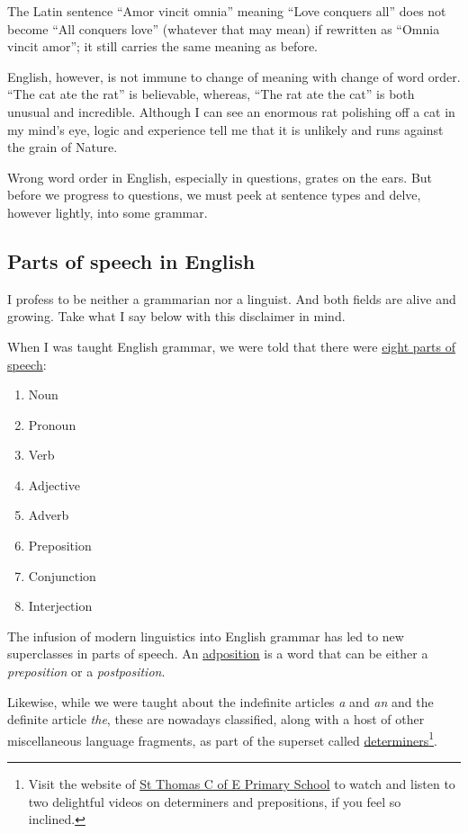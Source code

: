 \documentclass[
  a4paper,
]{article}
\providecommand{\tightlist}{%
  \setlength{\itemsep}{0pt}\setlength{\parskip}{0pt}}
\begin{document}
The Latin sentence ``Amor vincit omnia'' meaning ``Love conquers all''
does not become ``All conquers love'' (whatever that may mean) if
rewritten as ``Omnia vincit amor''; it still carries the same meaning as
before.

English, however, is not immune to change of meaning with change of word
order. ``The cat ate the rat'' is believable, whereas, ``The rat ate the
cat'' is both unusual and incredible. Although I can see an enormous rat
polishing off a cat in my mind's eye, logic and experience tell me that
it is unlikely and runs against the grain of Nature.

Wrong word order in English, especially in questions, grates on the
ears. But before we progress to questions, we must peek at sentence
types and delve, however lightly, into some grammar.

\hypertarget{parts-of-speech-in-english}{%
\subsection{Parts of speech in
English}\label{parts-of-speech-in-english}}

I profess to be neither a grammarian nor a linguist. And both fields are
alive and growing. Take what I say below with this disclaimer in mind.

When I was taught English grammar, we were told that there were
\href{http://www.butte.edu/departments/cas/tipsheets/grammar/parts_of_speech.html}{eight
parts of speech}:

\begin{enumerate}
\tightlist
\item
  Noun
\item
  Pronoun
\item
  Verb
\item
  Adjective
\item
  Adverb
\item
  Preposition
\item
  Conjunction
\item
  Interjection
\end{enumerate}

The infusion of modern linguistics into English grammar has led to new
superclasses in parts of speech. An
\href{https://glossary.sil.org/term/adposition}{adposition} is a word
that can be either a \emph{preposition} or a \emph{postposition}.

Likewise, while we were taught about the indefinite articles \emph{a}
and \emph{an} and the definite article \emph{the}, these are nowadays
classified, along with a host of other miscellaneous language fragments,
as part of the superset called
\href{https://en.wikipedia.org/wiki/Determiner}{determiners}\footnote{Visit
  the website of
  \href{https://www.stthomaswernethprimary.co.uk/determiners-and-prepositions-1/}{St
  Thomas C of E Primary School} to watch and listen to two delightful
  videos on determiners and prepositions, if you feel so inclined.}.
\end{document}
